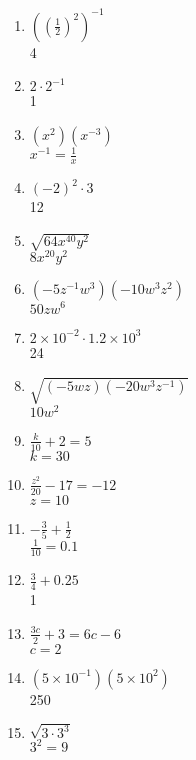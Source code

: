 \documentclass[12pt]{article}
\begin{document}
\begin{multicols}{2}
\begin{enumerate}
	\item \( ((\frac{1}{2})^{2})^{-1} \) \\
		4

	\item \( 2 \cdot 2^{-1} \) \\
		1

	\item \( (x^{2})(x^{-3}) \) \\
		\( x^{-1} = \frac{1}{x} \)

	\item \( (-2)^{2} \cdot 3 \) \\
		12

	\item \( \sqrt{64x^{40}y^{2}} \) \\
		\( 8x^{20}y^{2} \)

	\item \( (-5z^{-1}w^{3})(-10w^{3}z^{2}) \) \\
		\( 50zw^{6} \)

	\item \( 2 \times 10^{-2} \cdot 1.2 \times 10^{3}\) \\
		24

	\item \( \sqrt{ (-5wz)(-20w^{3}z^{-1}) } \) \\
		\( 10w^{2} \)

	\item \( \frac{k}{10} + 2 = 5 \) \\
		\( k = 30 \)

	\item \( \frac{z^{2}}{20} - 17 = -12 \) \\
		\( z = 10 \)

	\item \( -\frac{3}{5} + \frac{1}{2} \) \\
		\( \frac{1}{10} = 0.1 \)

	\item \( \frac{3}{4} + 0.25 \) \\
		1

	\item \( \frac{3c}{2} + 3 = 6c - 6 \) \\
		\( c = 2 \)

	\item \( (5 \times 10^{-1})(5 \times 10^{2}) \) \\
		250

	\item \( \sqrt{3\cdot3^{3}} \) \\
		\( 3^{2} = 9 \)


\end{enumerate}
\end{multicols}
\end{document}
